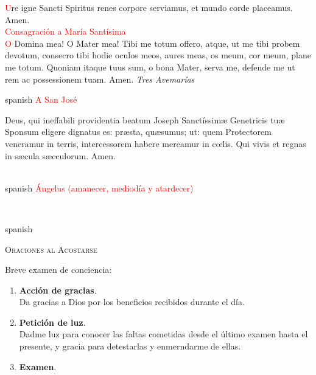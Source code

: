 \documentclass[9pt]{article}
\begin{document}
\begin{multicols*}{2}
      \textcolor{red}{U}re igne Sancti Spiritus renes corpore serviamus, et mundo corde placeamus. Amen.\\[1mm]
      \textcolor{red}{Consagración a María Santísima}\\
      \textcolor{red}{O} Domina mea! O Mater mea! Tibi me totum offero, atque, ut me tibi probem devotum, consecro tibi hodie oculos meos, aures meas, os meum, cor meum, plane me totum. 
      Quoniam itaque tuus sum, o bona Mater, serva me, defende me ut rem ac possessionem tuam. Amen. \textit{Tres Avemarías}\\[1mm]
      \begin{otherlanguage*}{spanish}
            \textcolor{red}{A San José}\\
      \end{otherlanguage*}
      Deus, qui ineffabili providentia beatum Joseph Sanctíssim{\ae} Genetricis tu{\ae} Sponsum eligere dignatus es: pr{\ae}sta, qu{\ae}sumus; ut: quem Protectorem veneramur in terris,
      intercessorem habere mereamur in c{\oe}lis. Qui vivis et regnas in s{\ae}cula s{\ae}cculorum. Amen. \\[1mm]
      \\[1mm]
      \begin{otherlanguage*}{spanish}
            \textcolor{red}{Ángelus (amanecer, mediodía y atardecer)}\\
      \end{otherlanguage*}
      \\[-2mm]
      \begin{otherlanguage*}{spanish}
            \begin{center}
                  \textsc{\Large{Oraciones al Acostarse}}
            \end{center}
            Breve examen de conciencia:
            \begin{enumerate}[noitemsep]
                  \item \textbf{Acción de gracias}.\\
                        Da gracias a Dios por los beneficios recibidos durante el día.
                  \item \textbf{Petición de luz}.\\
                        Dadme luz para conocer las faltas cometidas desde el último examen hasta el presente, y gracia para detestarlas y enmerndarme de ellas.
                  \item \textbf{Examen}.\\

\end{enumerate}
\end{otherlanguage*}
\end{multicols*}
\end{document}
